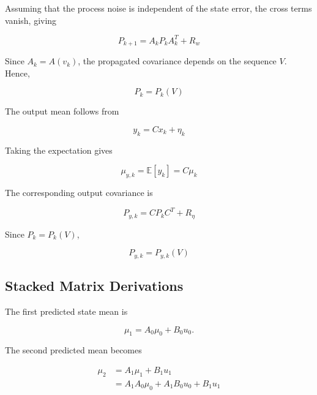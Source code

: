 Assuming that the process noise is independent of the state error, the
cross terms vanish, giving

\begin{equation}
    \boxed{
    P_{k+1}
    =
    A_kP_kA_k^T+R_w
    }
    \label{eq:sb_covariance}
\end{equation}

Since \(A_k=A(v_k)\), the propagated covariance depends on the sequence
\(V\). Hence,

\begin{equation}
    P_k=P_k(V)
\end{equation}

The output mean follows from

\begin{equation}
    y_k=Cx_k+\eta_k
\end{equation}

Taking the expectation gives

\begin{equation}
    \boxed{
    \mu_{y,k}
    =
    \mathbb{E}[y_k]
    =
    C\mu_k
    }
    \label{eq:sb_output_mean}
\end{equation}

The corresponding output covariance is

\begin{equation}
    \boxed{
    P_{y,k}
    =
    CP_kC^T+R_\eta
    }
    \label{eq:sb_output_covariance}
\end{equation}

Since \(P_k=P_k(V)\),

\begin{equation}
    P_{y,k}=P_{y,k}(V)
\end{equation}

\subsection{Stacked Matrix Derivations}

The first predicted state mean is

\begin{equation}
    \mu_1=A_0\mu_0+B_0u_0.
\end{equation}

The second predicted mean becomes

\begin{align}
    \mu_2
    &=
    A_1\mu_1+B_1u_1\\
    &=
    A_1A_0\mu_0
    +
    A_1B_0u_0
    +
    B_1u_1
\end{align}


